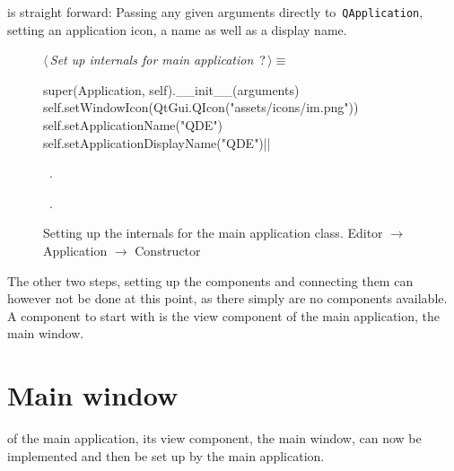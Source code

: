 \documentclass[%
    a4paper,    %
    justified,  %
    nobib,      %
    openany     %
]{tufte-book}
\makeatletter
\renewcommand{\label}[1]{\@tufte@label{##1}}%
\makeatother
\begin{document}
 is straight forward: Passing any given
arguments directly to~\verb=QApplication=, setting an application icon, a name
as well as a display name.

\begin{figure}[h]
\begin{flushleft} \small
\begin{minipage}{\linewidth}\label{scrap14}\raggedright\small
{} $\langle\,${\itshape Set up internals for main application}\nobreak\ {\footnotesize {?}}$\,\rangle\equiv$
\vspace{-1ex}
\begin{pythoncode}
super(Application, self).__init__(arguments)
self.setWindowIcon(QtGui.QIcon("assets/icons/im.png"))
self.setApplicationName("QDE")
self.setApplicationDisplayName("QDE")|\NWsep|
\end{pythoncode}
\vspace{1.5ex}
\footnotesize
\begin{list}{}{\setlength{\itemsep}{-\parsep}\setlength{\itemindent}{-\leftmargin}}
\item \NWtxtMacroDefBy\ .
\item \NWtxtMacroRefIn\ .

\item{}
\end{list}
\end{minipage}\vspace{4ex}
\end{flushleft}
\caption{Setting up the internals for the main application class.
  \newline{}\newline{}Editor $\rightarrow$ Application $\rightarrow$
  Constructor} \label{editor:lst:app:constructor:internals}
\end{figure}

The other two steps, setting up the components and connecting them can however
not be done at this point, as there simply are no components available. A
component to start with is the view component of the main application, the main
window.

\section{Main window}
\label{appendix:sec:editor:main-window}

 of the main application, its
view component, the main window, can now be implemented and then be set up by
the main application.
\end{document}
